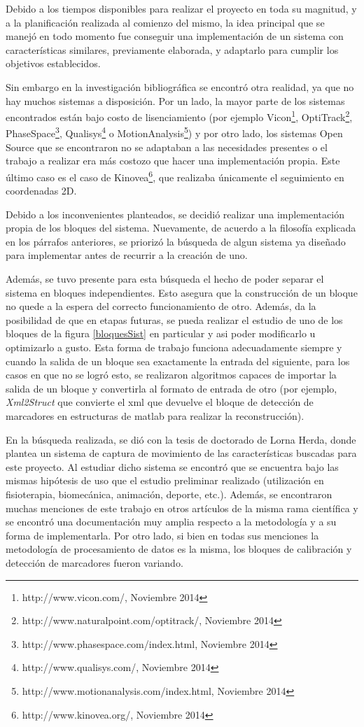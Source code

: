 Debido a los tiempos disponibles para realizar el proyecto en toda su magnitud, y a la planificación realizada al comienzo del mismo, la idea principal que se manejó en todo momento fue conseguir una implementación de un sistema con características similares, previamente elaborada, y adaptarlo para cumplir los objetivos establecidos. 

Sin embargo en la investigación bibliográfica se encontró otra realidad, ya que no hay muchos sistemas a disposición. Por un lado, la mayor parte de los sistemas encontrados están bajo costo de lisenciamiento (por ejemplo Vicon\footnote{http://www.vicon.com/, Noviembre 2014}, OptiTrack\footnote{http://www.naturalpoint.com/optitrack/, Noviembre 2014}, PhaseSpace\footnote{http://www.phasespace.com/index.html, Noviembre 2014}, Qualisys\footnote{http://www.qualisys.com/, Noviembre 2014} o MotionAnalysis\footnote{http://www.motionanalysis.com/index.html, Noviembre 2014}) y por otro lado, los sistemas Open Source que se encontraron no se adaptaban a las necesidades presentes o el trabajo a realizar era más costozo que hacer una implementación propia. Este último caso es el caso de Kinovea\footnote{http://www.kinovea.org/, Noviembre 2014}, que realizaba únicamente el seguimiento en coordenadas 2D.

Debido a los inconvenientes planteados, se decidió realizar una implementación propia de los bloques del sistema. Nuevamente, de acuerdo a la filosofía explicada en los párrafos anteriores, se priorizó la búsqueda de algun sistema ya diseñado para implementar antes de recurrir a la creación de uno.

Además, se tuvo presente para esta búsqueda el hecho de poder separar el sistema en bloques independientes. Esto asegura que la construcción de un bloque no quede a la espera del correcto funcionamiento de otro. Además, da la posibilidad de que en etapas futuras, se pueda realizar el estudio de uno de los bloques de la figura \ref{bloquesSist} en particular y asi poder modificarlo u optimizarlo a gusto. Esta forma de trabajo funciona adecuadamente siempre y cuando la salida de un bloque sea exactamente la entrada del siguiente, para los casos en que no se logró esto, se realizaron algoritmos capaces de importar la salida de un bloque y convertirla al formato de entrada de otro (por ejemplo, \textit{Xml2Struct} que convierte el xml que devuelve el bloque de detección de marcadores en estructuras de matlab para realizar la reconstrucción).

En la búsqueda realizada, se dió con la tesis de doctorado de Lorna Herda\cite{herda}, donde plantea un sistema de captura de movimiento de las características buscadas para este proyecto. Al estudiar dicho sistema se encontró que se encuentra bajo las mismas hipótesis de uso que el estudio preliminar realizado (utilización en fisioterapia, biomecánica, animación, deporte, etc.). Además, se encontraron muchas menciones de este trabajo en otros artículos de la misma rama científica y se encontró una documentación muy amplia respecto a la metodología y a su forma de implementarla. Por otro lado, si bien en todas sus menciones la metodología de procesamiento de datos es la misma, los bloques de calibración y detección de marcadores fueron variando.

